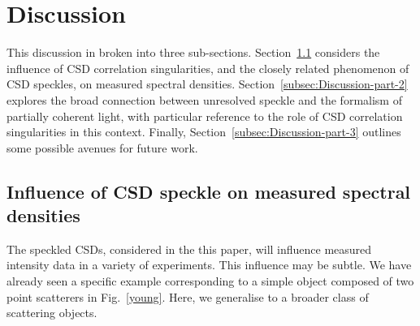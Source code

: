 \documentclass[%
 reprint,
 amsmath,amssymb,
 aps,
]{revtex4-1}
\begin{document}
\section{Discussion}

This discussion in broken into three sub-sections.  Section~\ref{subsec:Discussion-part-1} considers the influence of CSD correlation singularities, and the closely related phenomenon of CSD speckles, on measured spectral densities.  Section~\ref{subsec:Discussion-part-2} explores the broad connection between unresolved speckle and the formalism of partially coherent light, with particular reference to the role of CSD correlation singularities in this context.  Finally, Section~\ref{subsec:Discussion-part-3} outlines some possible avenues for future work.  
\subsection{Influence of CSD speckle on measured spectral densities}\label{subsec:Discussion-part-1}

The speckled CSDs, considered in the this paper, will influence measured intensity data in a variety of experiments.  This influence may be subtle.  We have already seen a specific example corresponding to a simple object composed of two point scatterers in Fig.~\ref{young}.  Here, we generalise to a broader class of scattering objects.
\end{document}
